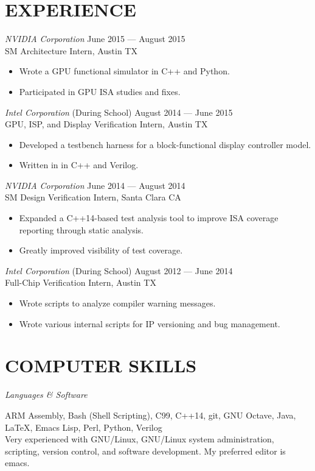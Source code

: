 \documentclass[margin]{res}
\begin{document}
\begin{resume}
  \section{EXPERIENCE}
  {\sl NVIDIA Corporation}
  \hfill June 2015 --- August 2015 \\
  SM Architecture Intern, Austin TX
  \vspace{0.25em}
  \begin{itemize}
  \item Wrote a GPU functional simulator in C++ and Python.
  \item Participated in GPU ISA studies and fixes.
  \end{itemize}
  {\sl Intel Corporation}
  \hfill (During School) August 2014 --- June 2015 \\
  GPU, ISP, and Display Verification Intern, Austin TX
  \vspace{0.25em}
  \begin{itemize}
  \item Developed a testbench harness for a block-functional display
    controller model.
  \item Written in in C++ and Verilog.
  \end{itemize}
  {\sl NVIDIA Corporation}
  \hfill June 2014 --- August 2014 \\
  SM Design Verification Intern, Santa Clara CA
  \vspace{0.25em}
  \begin{itemize}
  \item Expanded a C++14-based test analysis tool to improve ISA
    coverage reporting through static analysis.
  \item Greatly improved visibility of test coverage.
  \end{itemize}
  {\sl Intel Corporation}
  \hfill (During School) August 2012 --- June 2014 \\
  Full-Chip Verification Intern, Austin TX
  \vspace{0.25em}
  \begin{itemize}
  \item Wrote scripts to analyze compiler warning messages.
  \item Wrote various internal scripts for IP versioning and bug
    management.
  \end{itemize}

  \section{COMPUTER SKILLS}
  {\sl Languages \& Software} \\
  \vspace{-1.0em}
  \begin{adjustwidth}{1.5em}{0pt}
    ARM Assembly, Bash (Shell Scripting), C99, C++14, git, GNU Octave,
    Java, \LaTeX, Emacs Lisp, Perl, Python, Verilog
    \vspace{0.5em} \\
    Very experienced with GNU/Linux, GNU/Linux system administration,
    scripting, version control, and software development. My preferred
    editor is emacs.
  \end{adjustwidth}


\end{resume}
\end{document}

